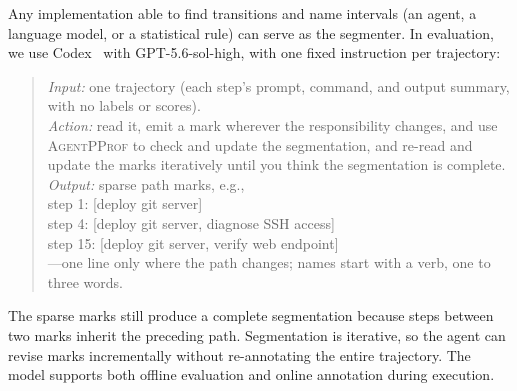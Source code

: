 \documentclass[sigconf,nonacm]{acmart}
\newcommand{\sys}{\textsc{AgentPProf}\xspace}
\begin{document}
Any implementation able to find transitions and name intervals (an agent, a language model, or a statistical rule) can serve as the segmenter.
In evaluation, we use Codex~\cite{codex} with GPT-5.6-sol-high, with one fixed instruction per trajectory:

\begin{quote}\small
\emph{Input:} one trajectory (each step's prompt, command, and output summary, with no labels or scores).\\
\emph{Action:} read it, emit a mark wherever the responsibility changes, and use \sys to check and update the segmentation, and re-read and update the marks iteratively until you think the segmentation is complete.\\
\emph{Output:} sparse path marks, e.g.,\\
{\footnotesize\ttfamily step 1: [deploy git server]\\
step 4: [deploy git server, diagnose SSH access]\\
step 15: [deploy git server, verify web endpoint]}\\
---one line only where the path changes; names start with a verb, one to three words.
\end{quote}

The sparse marks still produce a complete segmentation because steps between two marks inherit the preceding path.
Segmentation is iterative, so the agent can revise marks incrementally without re-annotating the entire trajectory.
The model supports both offline evaluation and online annotation during execution.
\end{document}
